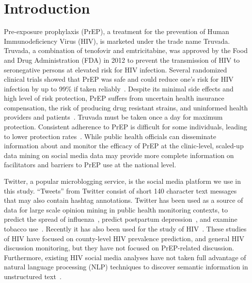 \documentclass[conference]{IEEEtran}
\begin{document}




%
\IEEEpeerreviewmaketitle



\section{Introduction}

Pre-exposure prophylaxis (PrEP), a treatment for the prevention of Human Immunodeficiency Virus (HIV), is marketed under the trade name Truvada. Truvada, a combination of tenofovir and emtricitabine, was approved by the Food and Drug Administration (FDA) in 2012 to prevent the transmission of HIV to seronegative persons at elevated risk for HIV infection. Several randomized clinical trials showed that PrEP was safe and could reduce one's risk for HIV infection by up to 99\% if taken reliably~\cite{grant2010preexposure,thigpen2012antiretroviral}. Despite its minimal side effects and high level of risk protection, PrEP suffers from uncertain health insurance compensation, the risk of producing drug resistant strains, and uninformed health providers and patients~\cite{liu2014early}. Truvada must be taken once a day for maximum protection. Consistent adherence to PrEP is difficult for some individuals, leading to lower protection rates~\cite{van2012unraveling}. While public health officials can disseminate information about and monitor the efficacy of PrEP at the clinic-level, scaled-up data mining on social media data may provide more complete information on facilitators and barriers to PrEP use at the national level.

Twitter, a popular microblogging service, is the social media platform we use in this study. ``Tweets'' from Twitter consist of short 140 character text messages that may also contain hashtag annotations. Twitter has been used as a source of data for large scale opinion mining in public health monitoring contexts, to predict the spread of influenza~\cite{aramaki2011twitter}, predict postpartum depression~\cite{de2013predicting}, and examine tobacco use~\cite{myslin2013using}. Recently it has also been used for the study of HIV~\cite{young2014methods,young2013online}. These studies of HIV have focused on county-level HIV prevalence prediction, and general HIV discussion monitoring, but they have not focused on PrEP-related discussion. Furthermore, existing HIV social media analyses have not taken full advantage of natural language processing (NLP) techniques to discover semantic information in unstructured text~\cite{young2015big}.
\end{document}
